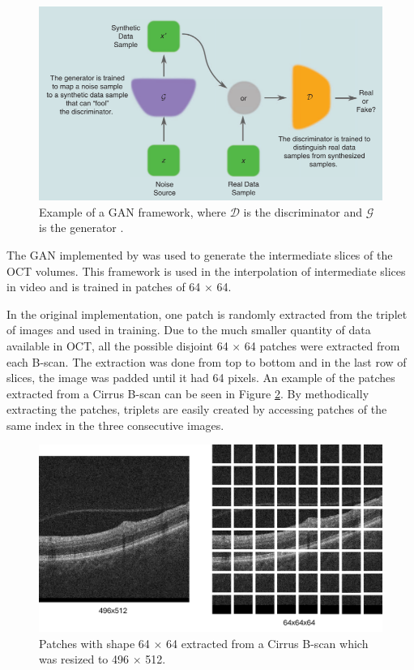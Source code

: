 \begin{figure}[!ht]
	\centering
	\includegraphics[width=0.7\linewidth]{figures/GANFramework}
	\caption{Example of a GAN framework, where $\mathcal{D}$ is the discriminator and $\mathcal{G}$ is the generator \cite{Creswell2018}.}
	\label{fig:GANFramework}
\end{figure}

The GAN implemented by \textcite{Tran2020} was used to generate the intermediate slices of the OCT volumes. This framework is used in the interpolation of intermediate slices in video and is trained in patches of 64 $\times$ 64.
\par
In the original implementation, one patch is randomly extracted from the triplet of images and used in training. Due to the much smaller quantity of data available in OCT, all the possible disjoint 64 $\times$ 64 patches were extracted from each B-scan. The extraction was done from top to bottom and in the last row of slices, the image was padded until it had 64 pixels. An example of the patches extracted from a Cirrus B-scan can be seen in Figure \ref{fig:CirrusSixtyFourPatchExtraction}. By methodically extracting the patches, triplets are easily created by accessing patches of the same index in the three consecutive images.

\begin{figure}[!ht]
	\centering
	\includegraphics[width=0.7\linewidth]{figures/CirrusSixtyFourPatchExtraction.png}
	\caption{Patches with shape 64 $\times$ 64 extracted from a Cirrus B-scan which was resized to 496 $\times$ 512.}
	\label{fig:CirrusSixtyFourPatchExtraction}
\end{figure}

